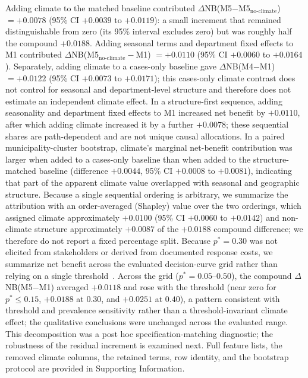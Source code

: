 \documentclass[11pt,a4paper]{article}
\begin{document}
Adding climate to the matched baseline contributed $\Delta$NB(M5$-$M5$_{\text{no-climate}}$) $=+0.0078$ (95\% CI $+0.0039$ to $+0.0119$): a small increment that remained distinguishable from zero (its 95\% interval excludes zero) but was roughly half the compound $+0.0188$. Adding seasonal terms and department fixed effects to M1 contributed $\Delta$NB(M5$_{\text{no-climate}}-$M1) $=+0.0110$ (95\% CI $+0.0060$ to $+0.0164$). Separately, adding climate to a cases-only baseline gave $\Delta$NB(M4$-$M1) $=+0.0122$ (95\% CI $+0.0073$ to $+0.0171$); this cases-only climate contrast does not control for seasonal and department-level structure and therefore does not estimate an independent climate effect. In a structure-first sequence, adding seasonality and department fixed effects to M1 increased net benefit by $+0.0110$, after which adding climate increased it by a further $+0.0078$; these sequential shares are path-dependent and are not unique causal allocations. In a paired municipality-cluster bootstrap, climate's marginal net-benefit contribution was larger when added to a cases-only baseline than when added to the structure-matched baseline (difference $+0.0044$, 95\% CI $+0.0008$ to $+0.0081$), indicating that part of the apparent climate value overlapped with seasonal and geographic structure. Because a single sequential ordering is arbitrary, we summarize the attribution with an order-averaged (Shapley) value over the two orderings, which assigned climate approximately $+0.0100$ (95\% CI $+0.0060$ to $+0.0142$) and non-climate structure approximately $+0.0087$ of the $+0.0188$ compound difference; we therefore do not report a fixed percentage split. Because $p^*=0.30$ was not elicited from stakeholders or derived from documented response costs, we summarize net benefit across the evaluated decision-curve grid rather than relying on a single threshold~\cite{VanCalster2019,Vickers2016}. Across the grid ($p^*=0.05$--$0.50$), the compound $\Delta$NB(M5$-$M1) averaged $+0.0118$ and rose with the threshold (near zero for $p^*\le0.15$, $+0.0188$ at $0.30$, and $+0.0251$ at $0.40$), a pattern consistent with threshold and prevalence sensitivity rather than a threshold-invariant climate effect; the qualitative conclusions were unchanged across the evaluated range. This decomposition was a post hoc specification-matching diagnostic; the robustness of the residual increment is examined next. Full feature lists, the removed climate columns, the retained terms, row identity, and the bootstrap protocol are provided in Supporting Information.
\end{document}
